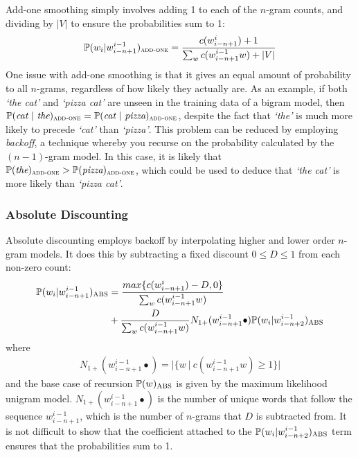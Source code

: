 \documentclass[a4paper, 12pt]{report}
\newcommand{\tit}[1]{\textit{#1}}
\begin{document}
Add-one smoothing \cite{add1_smoothing:johnson1932} simply involves adding 1 to each of the $n$-gram counts, and dividing by $|V|$ to ensure the probabilities sum to 1:
\begin{gather*}
	\mathbb{P}(w_i | w_{i - n + 1}^{i - 1})_{\text{\scshape add-one}} = \frac{c(w_{i - n + 1}^{i}) + 1}{\sum_w c(w_{i - n + 1}^{i - 1}w) + |V|}
\end{gather*}
One issue with add-one smoothing is that it gives an equal amount of probability to all $n$-grams, regardless of how likely they actually are. As an example, if both \tit{`the cat'} and \tit{`pizza cat'} are unseen in the training data of a bigram model, then $\mathbb{P}(\tit{cat}\ |\ \tit{the})_{\text{\scshape add-one}} = \mathbb{P}(\tit{cat}\ |\ \tit{pizza})_{\text{\scshape add-one}}$, despite the fact that \tit{`the'} is much more likely to precede \tit{`cat'} than \tit{`pizza'}. This problem can be reduced by employing \tit{backoff}, a technique whereby you recurse on the probability calculated by the $(n - 1)$-gram model. In this case, it is likely that $\mathbb{P}(\tit{the})_{\text{\scshape add-one}} > \mathbb{P}(\tit{pizza})_{\text{\scshape add-one}}$, which could be used to deduce that \tit{`the cat'} is more likely than \tit{`pizza cat'}.

\subsubsection{Absolute Discounting}

Absolute discounting employs backoff by interpolating higher and lower order $n$-gram models. It does this by subtracting a fixed discount $0 \leq D \leq 1$ from each non-zero count:
\begin{equation*}
\begin{aligned}
	\mathbb{P}(w_i | w_{i - n + 1}^{i - 1})_{\text{\scshape ABS}} &= \frac{max\{c(w_{i - n + 1}^{i}) - D, 0\}}{\sum_w c(w_{i - n + 1}^{i - 1}w)} \\
	&+ \frac{D}{\sum_w c(w_{i - n + 1}^{i - 1}w)}N_{1+}(w_{i - n + 1}^{i - 1}\bullet)\mathbb{P}(w_i | w_{i - n + 2}^{i - 1})_{\text{\scshape ABS}}
\end{aligned}
\end{equation*}
where
\begin{gather*}
	N_{1+}(w_{i - n + 1}^{i - 1}\bullet) = |\{ w\ |\ c(w_{i - n + 1}^{i - 1}w) \geq 1 \}|
\end{gather*}
and the base case of recursion $\mathbb{P}(w)_{\text{\scshape ABS}}$ is given by the maximum likelihood unigram model. $N_{1+}(w_{i - n + 1}^{i - 1}\bullet)$ is the number of unique words that follow the sequence $w_{i - n + 1}^{i - 1}$, which is the number of $n$-grams that $D$ is subtracted from. It is not difficult to show that the coefficient attached to the $\mathbb{P}(w_i | w_{i - n + 2}^{i - 1})_{\text{\scshape ABS}}$ term ensures that the probabilities sum to 1. \\
\end{document}
